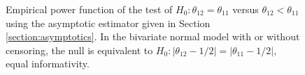 \documentclass[12pt]{article}
\DeclareMathOperator{\AUC}{AUC}
\newcommand{\cind}{\perp \!\!\! \perp}
\newcommand{\aucindiv}{\theta_{11}}%
\newcommand{\aucpop}{\theta_{12}}%
\newcommand{\comment}[1]{
  \iftoggle{commenttoggle}{
    {\normalsize{\color{red}{ #1}}\normalsize}
  }
  {}
}
\begin{document}
\begin{figure}[!tbp]
  \centering
  \hfill
  \caption{Empirical power function of the test of $H_0:\aucpop=\aucindiv$ versus $\aucpop<\aucindiv$ using the
     asymptotic estimator given in Section
     \ref{section:asymptotics}. In the bivariate normal model with or without censoring, the null is equivalent to $H_0:|\aucpop-1/2|=|\aucindiv-1/2|,$ equal informativity.}  \label{fig:power}
\end{figure}

\end{document}
